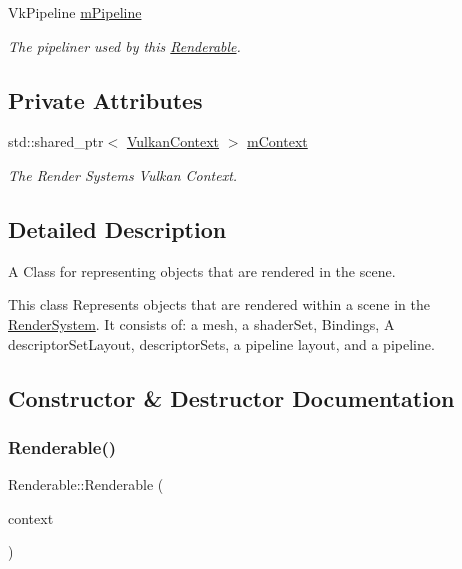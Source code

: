 \begin{DoxyCompactItemize}
\mbox{\label{class_renderable_a5a14d11983a29f3c46fba5ee248a1430}} 
Vk\+Pipeline \mbox{\hyperlink{class_renderable_a5a14d11983a29f3c46fba5ee248a1430}{m\+Pipeline}}
\begin{DoxyCompactList}\small\item\em The pipeliner used by this \mbox{\hyperlink{class_renderable}{Renderable}}. \end{DoxyCompactList}\end{DoxyCompactItemize}
\subsection*{Private Attributes}
\begin{DoxyCompactItemize}
\item 
\mbox{\label{class_renderable_a2aeb9aeb0f5ad17b19364700fc79fedd}} 
std\+::shared\+\_\+ptr$<$ \mbox{\hyperlink{class_vulkan_context}{Vulkan\+Context}} $>$ \mbox{\hyperlink{class_renderable_a2aeb9aeb0f5ad17b19364700fc79fedd}{m\+Context}}
\begin{DoxyCompactList}\small\item\em The Render System\textquotesingle{}s Vulkan Context. \end{DoxyCompactList}\end{DoxyCompactItemize}


\subsection{Detailed Description}
A Class for representing objects that are rendered in the scene. 

This class Represents objects that are rendered within a scene in the \mbox{\hyperlink{class_render_system}{Render\+System}}. It consists of\+: a mesh, a shader\+Set, Bindings, A descriptor\+Set\+Layout, descriptor\+Sets, a pipeline layout, and a pipeline. 

\subsection{Constructor \& Destructor Documentation}
\mbox{\label{class_renderable_a213b8f43e89f788eb08dc3862bfe83d1}} 
\subsubsection{\texorpdfstring{Renderable()}{Renderable()}}
{\footnotesize\ttfamily Renderable\+::\+Renderable (\begin{DoxyParamCaption}\item[{std\+::shared\+\_\+ptr$<$ \mbox{\hyperlink{class_vulkan_context}{Vulkan\+Context}} $>$}]{context }\end{DoxyParamCaption})}



